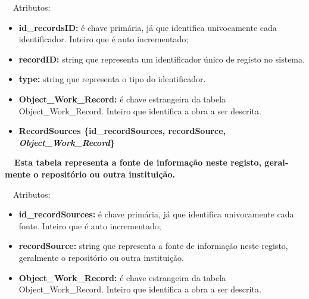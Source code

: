 \documentclass[letterpaper]{article}
\newcommand\textstyleStrongEmphasis[1]{\textbf{#1}}
\newcommand\liststyleLi{%
\renewcommand\labelitemi{{\textbullet}}
\renewcommand\labelitemii{[27A2?]}
\renewcommand\labelitemiii{{\textbullet}}
\renewcommand\labelitemiv{{\textbullet}}
}
\newcommand\liststyleLvi{%
\renewcommand\labelitemi{[27A2?]}
\renewcommand\labelitemii{[27A2?]}
\renewcommand\labelitemiii{[27A2?]}
\renewcommand\labelitemiv{[27A2?]}
}
\begin{document}
\bigskip

{
\ \ Atributos:}

\liststyleLvi
\begin{itemize}
\item {
\textbf{id\_}\textbf{recordsID}\textbf{:} \'e chave prim\'aria, j\'a que
identifica univocamente cada identificador. Inteiro que \'e auto
incrementado;}
\item {
\textbf{recordID:} string que representa um identificador \'unico de
registo no sistema.}
\item {
\textbf{type:} string que representa o tipo do identificador.}
\item {
\textbf{Object\_Work\_Record:}\textit{ }\'e chave estrangeira da tabela
Object\_Work\_Record. Inteiro que identifica a obra a ser descrita.}
\end{itemize}

\bigskip

\liststyleLi
\begin{itemize}
\item {\bfseries
RecordSources\textmd{ \{}\textmd{id\_recordSources}\textmd{,
recordSource, }\textmd{\textit{Object\_Work\_Record}}\textmd{\}}}
\end{itemize}
{\bfseries
\foreignlanguage{english}{\textmd{\ \ Esta
}}\textstyleStrongEmphasis{\foreignlanguage{english}{\textmd{tabela}}}\foreignlanguage{english}{\textmd{
representa a fonte de informa\c{c}\~ao neste registo, geralmente o
reposit\'orio ou outra institui\c{c}\~ao.}}}


\bigskip

{
\ \ Atributos:}

\liststyleLvi
\begin{itemize}
\item {
\textbf{id\_}\textbf{recordSources}\textbf{:} \'e chave prim\'aria, j\'a
que identifica univocamente cada fonte. Inteiro que \'e auto
incrementado;}
\item {
\textbf{recordSource:} string que representa a fonte de informa\c{c}\~ao
neste registo, geralmente o reposit\'orio ou outra institui\c{c}\~ao.}
\item {
\textbf{Object\_Work\_Record:}\textit{ }\'e chave estrangeira da tabela
Object\_Work\_Record. Inteiro que identifica a obra a ser descrita.}
\end{itemize}
\end{document}

